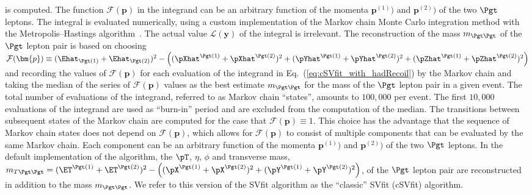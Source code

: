 is computed.
The function $\mathcal{F}(\bm{p})$ in the integrand can be an arbitrary function of the momenta $\bm{p}^{(1)})$ and $\bm{p}^{(2)})$ of the two $\Pgt$ leptons.
The integral is evaluated numerically, using a custom implementation of the Markov chain Monte Carlo integration method with the Metropolis--Hastings algorithm~\cite{Metropolis_Hastings}.
The actual value $\mathcal{L}(\bm{y})$ of the integral is irrelevant.
The reconstruction of the mass $m_{\Pgt\Pgt}$ of the $\Pgt$ lepton pair is based on choosing 
$\mathcal{F}(\bm{p}) \equiv (\Ehat_{\Pgt(1)} + \Ehat_{\Pgt(2)})^{2} 
 - \left( (\pXhat^{\Pgt(1)} + \pXhat^{\Pgt(2)})^{2} + (\pYhat^{\Pgt(1)} + \pYhat^{\Pgt(2)})^{2} + (\pZhat^{\Pgt(1)} + \pZhat^{\Pgt(2)})^{2} \right)$
and recording the values of $\mathcal{F}(\bm{p})$ for each evaluation of the integrand in Eq.~(\ref{eq:cSVfit_with_hadRecoil}) by the Markov chain
and taking the median of the series of $\mathcal{F}(\bm{p})$ values
as the best estimate $m_{\Pgt\Pgt}$ for the mass of the $\Pgt$ lepton pair in a given event.
The total number of evaluations of the integrand, referred to as Markov chain ``states'',  
amounts to $100,000$ per event. The first $10,000$ evaluations of the integrand are used as ``burn-in'' period and are excluded from the computation of the median.
The transitions between subsequent states of the Markov chain are computed for the case that $\mathcal{F}(\bm{p}) \equiv 1$.
This choice has the advantage that the sequence of Markov chain states does not depend on $\mathcal{F}(\bm{p})$,
which allows for $\mathcal{F}(\bm{p})$ to consist of multiple components that can be evaluated by the same Markov chain.
Each component can be an arbitrary function of the momenta $\bm{p}^{(1)})$ and $\bm{p}^{(2)})$ of the two $\Pgt$ leptons.
In the default implementation of the algorithm,
the $\pT$, $\eta$, $\phi$ and transverse mass, $m_{T\Pgt\Pgt} = (\ET^{\Pgt(1)} + \ET^{\Pgt(2)})^{2} 
 - \left( (\pX^{\Pgt(1)} + \pX^{\Pgt(2)})^{2} + (\pY^{\Pgt(1)} + \pY^{\Pgt(2)})^{2} \right)$, of the $\Pgt$ lepton pair
are reconstructed in addition to the mass $m_{\Pgt\Pgt}$.
We refer to this version of the SVfit algorithm as the ``classic'' SVfit (cSVfit) algorithm.

